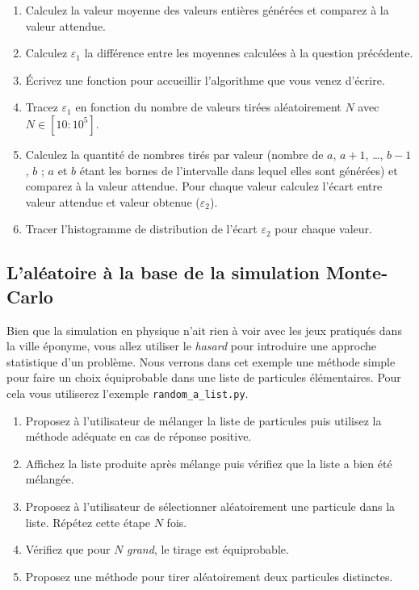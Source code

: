 \begin{enumerate}
\item  Calculez la  valeur moyenne  des valeurs  entières générées  et
  comparez à la valeur attendue.

\item  Calculez  $\varepsilon_1$  la  différence  entre  les  moyennes
  calculées à la question précédente.

\item Écrivez une fonction pour accueillir l'algorithme que vous venez
  d'écrire.


\item Tracez $\varepsilon_1$  en fonction du nombre  de valeurs tirées
  aléatoirement $N$ avec $N \in [10:10^5]$.

\item Calculez la quantité de nombres tirés par valeur (nombre de $a$,
  $a+1$, \dots,  $b-1$, $b$ ; $a$ et $b$ étant les bornes de
  l'intervalle dans lequel elles sont générées)  et comparez à
  la valeur  attendue. Pour
  chaque  valeur  calculez l'écart  entre  valeur  attendue et  valeur
  obtenue ($\varepsilon_2$).

\item Tracer l'histogramme de  distribution de l'écart $\varepsilon_2$
  pour chaque valeur.

\end{enumerate}


\subsection{L'aléatoire à la base de la simulation Monte-Carlo}

Bien que  la simulation en  physique n'ait rien  à voir avec  les jeux
pratiqués   dans   la   ville   éponyme,  vous   allez   utiliser   le
\textit{hasard}   pour  introduire   une  approche   statistique  d'un
problème.  Nous verrons dans cet exemple une méthode simple pour faire
un choix équiprobable dans une liste de particules élémentaires.  Pour
cela vous utiliserez l'exemple \texttt{random\_a\_list.py}.

\begin{enumerate}
\item Proposez à l'utilisateur de mélanger la liste de particules puis
  utilisez la méthode adéquate en cas de réponse positive.  %
\item Affichez  la liste produite  après mélange puis vérifiez  que la
  liste a bien été mélangée.  %
\item  Proposez  à  l'utilisateur de  sélectionner  aléatoirement  une
  particule dans la liste. Répétez cette étape $N$ fois.  %
\item   Vérifiez  que   pour   $N$  \textit{grand},   le  tirage   est
  équiprobable.  %
\item Proposez  une méthode pour tirer  aléatoirement deux particules
  distinctes.  %
\end{enumerate}

